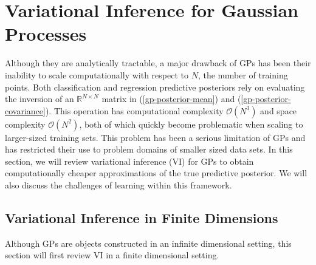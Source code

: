 \documentclass{article}
\numberwithin{equation}{section}
\begin{document}
\section{Variational Inference for Gaussian Processes}\label{section:vi-gp}
Although they are analytically tractable, a major drawback of GPs has been their inability to scale computationally with respect to $N$, the number of training points.
Both classification and regression predictive posteriors rely on evaluating the inversion of an $\mathbb{R}^{N \times N}$ matrix in (\ref{gp-posterior-mean}) and (\ref{gp-posterior-covariance}).
This operation has computational complexity $\mathcal{O}(N^3)$ and space complexity $\mathcal{O}(N^2)$, both of which quickly become problematic when scaling to larger-sized training sets.
This problem has been a serious limitation of GPs and has restricted their use to problem domains of smaller sized data sets.
In this section, we will review variational inference (VI) for GPs to obtain computationally cheaper approximations of the true predictive posterior.
We will also discuss the challenges of learning within this framework.

\subsection{Variational Inference in Finite Dimensions}\label{section:vi-in-finite-dimensions}
Although GPs are objects constructed in an infinite dimensional setting, this section will first review VI in a finite dimensional setting.
\end{document}
